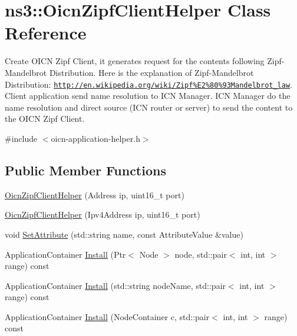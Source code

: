 \hypertarget{classns3_1_1OicnZipfClientHelper}{\section{ns3\-:\-:Oicn\-Zipf\-Client\-Helper Class Reference}
\label{classns3_1_1OicnZipfClientHelper}
}


Create O\-I\-C\-N Zipf Client, it generates request for the contents following Zipf-\/\-Mandelbrot Distribution. Here is the explanation of Zipf-\/\-Mandelbrot Distribution\-: \href{http://en.wikipedia.org/wiki/Zipf%E2%80%93Mandelbrot_law}{\tt http\-://en.\-wikipedia.\-org/wiki/\-Zipf\%\-E2\%80\%93\-Mandelbrot\-\_\-law}. Client application send name resolution to I\-C\-N Manager. I\-C\-N Manager do the name resolution and direct source (I\-C\-N router or server) to send the content to the O\-I\-C\-N Zipf Client.  




{\ttfamily \#include $<$oicn-\/application-\/helper.\-h$>$}

\subsection*{Public Member Functions}
\begin{DoxyCompactItemize}
\item 
\hyperlink{classns3_1_1OicnZipfClientHelper_a27bd450f6cb2b16174211d9d5a2903a4}{Oicn\-Zipf\-Client\-Helper} (Address ip, uint16\-\_\-t port)
\item 
\hyperlink{classns3_1_1OicnZipfClientHelper_a2228e966e0cd82a5603f556258271ae2}{Oicn\-Zipf\-Client\-Helper} (Ipv4\-Address ip, uint16\-\_\-t port)
\item 
void \hyperlink{classns3_1_1OicnZipfClientHelper_a9908ce9cd685c341451e3d05fef9e285}{Set\-Attribute} (std\-::string name, const Attribute\-Value \&value)
\item 
Application\-Container \hyperlink{classns3_1_1OicnZipfClientHelper_a47e27c095b091e4643b03e94f5fccc00}{Install} (Ptr$<$ Node $>$ node, std\-::pair$<$ int, int $>$ range) const 
\item 
Application\-Container \hyperlink{classns3_1_1OicnZipfClientHelper_a3a3875e8c846e07fd31b36f53b90d350}{Install} (std\-::string node\-Name, std\-::pair$<$ int, int $>$ range) const 
\item 
Application\-Container \hyperlink{classns3_1_1OicnZipfClientHelper_a9557b8ad953de1aaa31a9477c8ebf432}{Install} (Node\-Container c, std\-::pair$<$ int, int $>$ range) const 
\end{DoxyCompactItemize}
